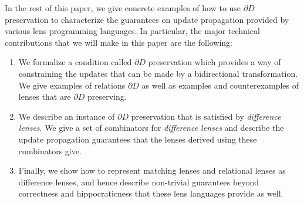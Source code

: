 \documentclass[acmsmall,review,anonymous]{acmart}\settopmatter{printfolios=true,printccs=false,printacmref=false}
\theoremstyle{definition}
\begin{document}
In the rest of this paper, we give concrete examples of how to use $\partial D$ preservation to characterize 
the guarantees on update propagation provided by various lens programming languages. In particular,
the major technical contributions that we will make in this paper are the following:
\begin{enumerate}
  \item
  We formalize a condition called $\partial D$ preservation which provides a way
  of constraining the updates that can be made by a bidirectional
  transformation. We give examples of relations $\partial D$ as well as
  examples and counterexamples of lenses that are $\partial D$ preserving.
  \item
  We describe an instance of $\partial D$ preservation that is satisfied by {\em difference lenses}. We give a set of combinators for {\em difference lenses} and describe the update propagation guarantees that the lenses derived using these combinators give.
  \item
  Finally, we show how to represent matching lenses and relational lenses
  \cite{bohannon2006relational} as difference lenses, and hence
  describe non-trivial guarantees beyond correctness and hippocraticness that
  these lens languages provide as well.
\end{enumerate}
\fi
\end{document}
